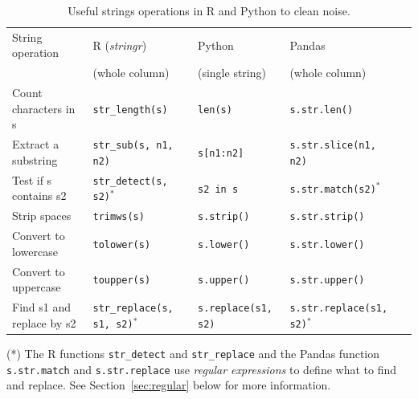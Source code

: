\begin{table}
  \caption{\label{tab:stringoperations}Useful strings operations in R and Python to clean noise.}{
  \begin{tabularx}{\textwidth}{lllll}
    \toprule
    String operation      & R (\index{stringr}\emph{stringr})  & Python  & Pandas\\
                          & (whole column)  & (single string) & (whole column)\\
    \midrule
Count characters in s & \texttt{\small{str\_length(s)}}          & \texttt{\small{len(s)}}        & \texttt{\small{s.str.len()}}  \\
Extract a substring   & \texttt{\small{str\_sub(s, n1, n2)}}     & \texttt{\small{s[n1:n2]}} & \texttt{\small{s.str.slice(n1, n2)}} \\
Test if s contains s2 & \texttt{\small{str\_detect(s, s2)}}$^*$       & \texttt{\small{s2 in s}}       & \texttt{\small{s.str.match(s2)$^*$}} \\
Strip spaces          & \texttt{\small{trimws(s)}}               & \texttt{\small{s.strip()}}     & \texttt{\small{s.str.strip()}} \\
Convert to lowercase  & \texttt{\small{tolower(s)}}              & \texttt{\small{s.lower()}}     & \texttt{\small{s.str.lower()}} \\
Convert to uppercase  & \texttt{\small{toupper(s)}}              & \texttt{\small{s.upper()}}     & \texttt{\small{s.str.upper()}} \\
Find s1 and replace by s2 & \texttt{\small{str\_replace(s, s1, s2)}}$^*$ & \texttt{\small{s.replace(s1, s2)}} & \texttt{\small{s.str.replace(s1, s2)$^*$}}  \\
    \bottomrule
  \end{tabularx}}{(*) The R functions \texttt{\small{str\_detect}} and \texttt{\small{str\_replace}} and the Pandas function \texttt{\small{s.str.match}} and \texttt{\small{s.str.replace}} use \emph{regular expressions} to define what to find and replace. See Section~\ref{sec:regular} below for more information.}
\end{table}

